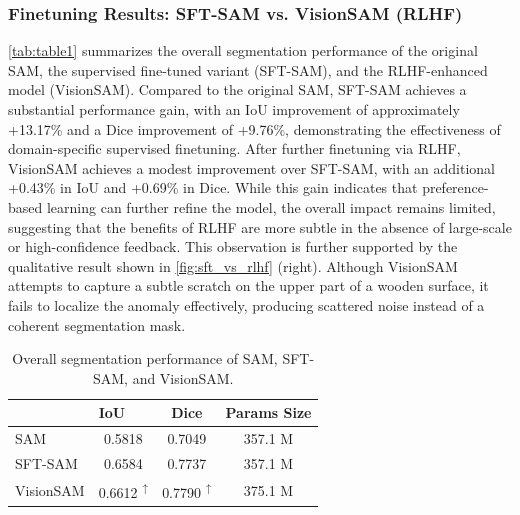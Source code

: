 \documentclass[11pt]{article}
\newcommand{\model}{VisionSAM}
\begin{document}
\subsubsection{Finetuning Results: SFT-SAM vs. VisionSAM (RLHF)}





\autoref{tab:table1} summarizes the overall segmentation performance of the original SAM, the supervised fine-tuned variant (SFT-SAM), and the RLHF-enhanced model (VisionSAM). Compared to the original SAM, SFT-SAM achieves a substantial performance gain, with an IoU improvement of approximately +13.17\% and a Dice improvement of +9.76\%, demonstrating the effectiveness of domain-specific supervised finetuning. After further finetuning via RLHF, VisionSAM achieves a modest improvement over SFT-SAM, with an additional +0.43\% in IoU and +0.69\% in Dice. While this gain indicates that preference-based learning can further refine the model, the overall impact remains limited, suggesting that the benefits of RLHF are more subtle in the absence of large-scale or high-confidence feedback. This observation is further supported by the qualitative result shown in \autoref{fig:sft_vs_rlhf} (right). Although VisionSAM attempts to capture a subtle scratch on the upper part of a wooden surface, it fails to localize the anomaly effectively, producing scattered noise instead of a coherent segmentation mask.

\begin{table}[htbp]
  \centering
  \caption{Overall segmentation performance of SAM, SFT-SAM, and \model.}
    \begin{tabular}{lccc}
    \toprule
          & \multicolumn{1}{l}{IoU} & Dice & Params Size \\
    \midrule
    SAM  & 0.5818  & 0.7049 & 357.1 M \\
    SFT-SAM & 0.6584 & 0.7737 & 357.1 M \\
    \model & 0.6612 \textsuperscript{↑} & 0.7790 \textsuperscript{↑} & 375.1 M \\
    \bottomrule
    \end{tabular}%
  \label{tab:table1}%
\end{table}%
\end{document}
